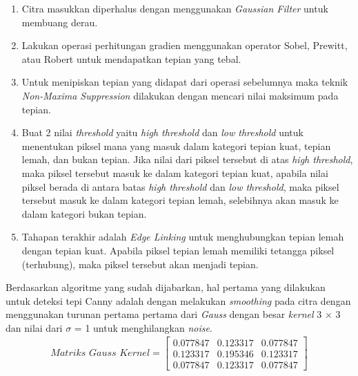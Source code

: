 \begin{enumerate}[leftmargin=16pt]
\item Citra masukkan diperhalus dengan menggunakan \textit{Gaussian Filter} untuk membuang derau.
\item Lakukan operasi perhitungan gradien menggunakan operator Sobel, Prewitt, atau Robert untuk mendapatkan tepian yang tebal.
\item Untuk menipiskan tepian yang didapat dari operasi sebelumnya maka teknik \textit{Non-Maxima Suppression} dilakukan dengan mencari nilai maksimum pada tepian.
\item Buat 2 nilai \textit{threshold} yaitu \textit{high threshold} dan \textit{low threshold} untuk menentukan piksel mana yang masuk dalam kategori tepian kuat, tepian lemah, dan bukan tepian. Jika nilai dari piksel tersebut di atas \textit{high threshold}, maka piksel tersebut masuk ke dalam kategori tepian kuat, apabila nilai piksel berada di antara batas \textit{high threshold} dan \textit{low threshold}, maka piksel tersebut masuk ke dalam kategori tepian lemah, selebihnya akan masuk ke dalam kategori bukan tepian.
\item Tahapan terakhir adalah \textit{Edge Linking} untuk menghubungkan tepian lemah dengan tepian kuat. Apabila piksel tepian lemah memiliki tetangga piksel (terhubung), maka piksel tersebut akan menjadi tepian.
\end{enumerate}
%

\noindent Berdasarkan algoritme yang sudah dijabarkan, hal pertama yang dilakukan untuk deteksi tepi Canny adalah dengan melakukan \textit{smoothing} pada citra dengan menggunakan turunan pertama pertama dari \textit{Gauss} dengan besar \textit{kernel} 3 $\times$ 3 dan nilai dari $\sigma$ = 1 untuk menghilangkan \textit{noise}.
\begin{gather*}
\textit{Matriks Gauss Kernel}
=
\begin{bmatrix}
0.077847 & 0.123317 & 0.077847 \\
0.123317 & 0.195346	& 0.123317 \\
0.077847 & 0.123317 & 0.077847
\end{bmatrix}
\label{eq:MatriksGaussKernel}
\end{gather*} 

